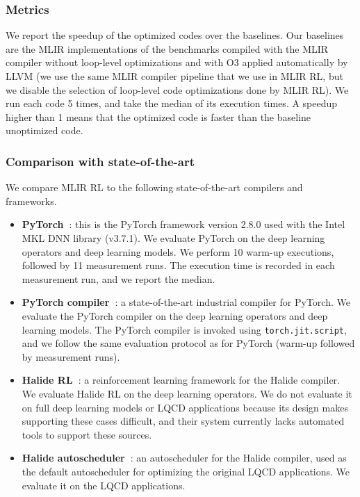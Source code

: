 \documentclass[10pt,twocolumn]{article}
\begin{document}
\subsubsection{Metrics}
We report the speedup of the optimized codes over the baselines. Our baselines are the MLIR implementations of the benchmarks compiled with the MLIR compiler without loop-level optimizations and with O3 applied automatically by LLVM (we use the same MLIR compiler pipeline that we use in MLIR RL, but we disable the selection of loop-level code optimizations done by MLIR RL). We run each code 5 times, and take the median of its execution times. A speedup higher than 1 means that the optimized code is faster than the baseline unoptimized code.

\subsubsection{Comparison with state-of-the-art}
We compare MLIR RL to the following state-of-the-art compilers and frameworks.

\begin{itemize}
\item \textbf{PyTorch~\cite{ref14}}: this is the PyTorch framework version 2.8.0 used with the Intel MKL DNN library (v3.7.1). We evaluate PyTorch on the deep learning operators and deep learning models. We perform 10 warm-up executions, followed by 11 measurement runs. The execution time is recorded in each measurement run, and we report the median.
\item \textbf{PyTorch compiler~\cite{ref15}}: a state-of-the-art industrial compiler for PyTorch. We evaluate the PyTorch compiler on the deep learning operators and deep learning models. The PyTorch compiler is invoked using \texttt{torch.jit.script}, and we follow the same evaluation protocol as for PyTorch (warm-up followed by measurement runs).
\item \textbf{Halide RL~\cite{ref6}}: a reinforcement learning framework for the Halide compiler. We evaluate Halide RL on the deep learning operators. We do not evaluate it on full deep learning models or LQCD applications because its design makes supporting these cases difficult, and their system currently lacks automated tools to support these sources.
\item \textbf{Halide autoscheduler~\cite{ref16}}: an autoscheduler for the Halide compiler, used as the default autoscheduler for optimizing the original LQCD applications. We evaluate it on the LQCD applications.
\end{itemize}
\end{document}
